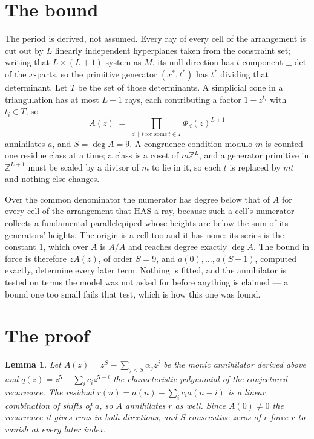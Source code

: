 \documentclass[11pt,a4paper]{article}
\theoremstyle{plain}
\newtheorem{lemma}[theorem]{Lemma}
\theoremstyle{definition}
\begin{document}
\section{The bound}

The period is derived, not assumed. Every ray of every cell of the arrangement is cut out by
$L$ linearly independent hyperplanes taken from the constraint set; writing that $L\times(L+1)$
system as $M$, its null direction has $t$-component $\pm\det$ of the $x$-parts, so the
primitive generator $(x^*,t^*)$ has $t^*$ dividing that determinant. Let $T$ be the set of
those determinants. A simplicial cone in a triangulation has at most $L+1$ rays, each
contributing a factor $1-z^{t_i}$ with $t_i\in T$, so
\[
A(z)\;=\;\prod_{d\,\mid\,t\ \text{for some}\ t\in T}\Phi_d(z)^{L+1}
\]
annihilates $a$, and $S=\deg A=9$. A congruence condition modulo $m$ is counted one residue
class at a time; a class is a coset of $m\mathbb{Z}^L$, and a generator primitive in
$\mathbb{Z}^{L+1}$ must be scaled by a divisor of $m$ to lie in it, so each $t$ is replaced
by $mt$ and nothing else changes.

Over the common denominator the numerator has degree below that of $A$ for every cell of the
arrangement that HAS a ray, because such a cell's numerator collects a fundamental
parallelepiped whose heights are below the sum of its generators' heights. The origin is a cell
too and it has none: its series is the constant $1$, which over $A$ is $A/A$ and reaches degree
exactly $\deg A$. The bound in force is therefore $zA(z)$, of order $S=9$, and
$a(0),\dots,a(S-1)$, computed exactly, determine every later term. Nothing is fitted, and the
annihilator is tested on terms the model was not asked for before anything is claimed --- a
bound one too small fails that test, which is how this one was found.

\section{The proof}

\begin{lemma}\label{lem:crit}
Let $A(z)=z^S-\sum_{j<S}\alpha_jz^{j}$ be the monic annihilator derived above and
$q(z)=z^{5}-\sum_ic_iz^{5-i}$ the characteristic polynomial of the conjectured
recurrence. The residual $r(n)=a(n)-\sum_ic_ia(n-i)$ is a linear combination of shifts of $a$,
so $A$ annihilates $r$ as well. Since $A(0)\ne0$ the recurrence it gives runs in both
directions, and $S$ consecutive zeros of $r$ force $r$ to vanish at every later index.
\end{lemma}
\end{document}
